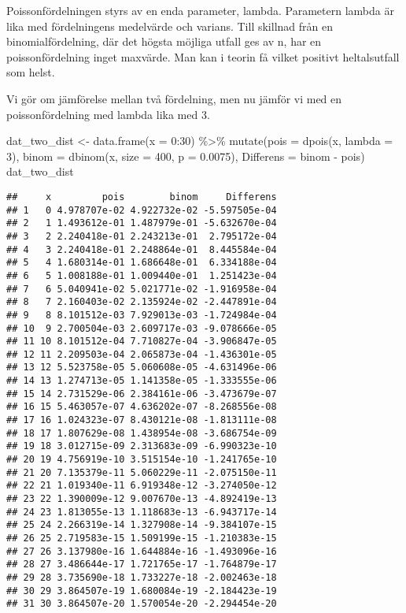 \documentclass[
]{book}
\newenvironment{Shaded}{\begin{snugshade}}{\end{snugshade}}
\newcommand{\AttributeTok}[1]{\textcolor[rgb]{0.77,0.63,0.00}{#1}}
\newcommand{\DecValTok}[1]{\textcolor[rgb]{0.00,0.00,0.81}{#1}}
\newcommand{\FloatTok}[1]{\textcolor[rgb]{0.00,0.00,0.81}{#1}}
\newcommand{\FunctionTok}[1]{\textcolor[rgb]{0.00,0.00,0.00}{#1}}
\newcommand{\NormalTok}[1]{#1}
\newcommand{\OtherTok}[1]{\textcolor[rgb]{0.56,0.35,0.01}{#1}}
\newcommand{\SpecialCharTok}[1]{\textcolor[rgb]{0.00,0.00,0.00}{#1}}
\theoremstyle{definition}
\theoremstyle{definition}
\theoremstyle{definition}
\theoremstyle{definition}
\theoremstyle{remark}
\begin{document}
Poissonfördelningen styrs av en enda parameter, lambda. Parametern lambda är lika med fördelningens medelvärde och varians. Till skillnad från en binomialfördelning, där det högsta möjliga utfall ges av n, har en poissonfördelning inget maxvärde. Man kan i teorin få vilket positivt heltalsutfall som helst.

Vi gör om jämförelse mellan två fördelning, men nu jämför vi med en poissonfördelning med lambda lika med 3.

\begin{Shaded}
\begin{Highlighting}[]
\NormalTok{dat\_two\_dist }\OtherTok{\textless{}{-}} \FunctionTok{data.frame}\NormalTok{(}\AttributeTok{x =} \DecValTok{0}\SpecialCharTok{:}\DecValTok{30}\NormalTok{) }\SpecialCharTok{\%\textgreater{}\%} 
  \FunctionTok{mutate}\NormalTok{(}\AttributeTok{pois =} \FunctionTok{dpois}\NormalTok{(x, }\AttributeTok{lambda =} \DecValTok{3}\NormalTok{),}
         \AttributeTok{binom =} \FunctionTok{dbinom}\NormalTok{(x, }\AttributeTok{size =} \DecValTok{400}\NormalTok{, }\AttributeTok{p =} \FloatTok{0.0075}\NormalTok{),}
         \AttributeTok{Differens =}\NormalTok{ binom }\SpecialCharTok{{-}}\NormalTok{ pois)}
\NormalTok{dat\_two\_dist}
\end{Highlighting}
\end{Shaded}

\begin{verbatim}
##     x         pois        binom     Differens
## 1   0 4.978707e-02 4.922732e-02 -5.597505e-04
## 2   1 1.493612e-01 1.487979e-01 -5.632670e-04
## 3   2 2.240418e-01 2.243213e-01  2.795172e-04
## 4   3 2.240418e-01 2.248864e-01  8.445584e-04
## 5   4 1.680314e-01 1.686648e-01  6.334188e-04
## 6   5 1.008188e-01 1.009440e-01  1.251423e-04
## 7   6 5.040941e-02 5.021771e-02 -1.916958e-04
## 8   7 2.160403e-02 2.135924e-02 -2.447891e-04
## 9   8 8.101512e-03 7.929013e-03 -1.724984e-04
## 10  9 2.700504e-03 2.609717e-03 -9.078666e-05
## 11 10 8.101512e-04 7.710827e-04 -3.906847e-05
## 12 11 2.209503e-04 2.065873e-04 -1.436301e-05
## 13 12 5.523758e-05 5.060608e-05 -4.631496e-06
## 14 13 1.274713e-05 1.141358e-05 -1.333555e-06
## 15 14 2.731529e-06 2.384161e-06 -3.473679e-07
## 16 15 5.463057e-07 4.636202e-07 -8.268556e-08
## 17 16 1.024323e-07 8.430121e-08 -1.813111e-08
## 18 17 1.807629e-08 1.438954e-08 -3.686754e-09
## 19 18 3.012715e-09 2.313683e-09 -6.990323e-10
## 20 19 4.756919e-10 3.515154e-10 -1.241765e-10
## 21 20 7.135379e-11 5.060229e-11 -2.075150e-11
## 22 21 1.019340e-11 6.919348e-12 -3.274050e-12
## 23 22 1.390009e-12 9.007670e-13 -4.892419e-13
## 24 23 1.813055e-13 1.118683e-13 -6.943717e-14
## 25 24 2.266319e-14 1.327908e-14 -9.384107e-15
## 26 25 2.719583e-15 1.509199e-15 -1.210383e-15
## 27 26 3.137980e-16 1.644884e-16 -1.493096e-16
## 28 27 3.486644e-17 1.721765e-17 -1.764879e-17
## 29 28 3.735690e-18 1.733227e-18 -2.002463e-18
## 30 29 3.864507e-19 1.680084e-19 -2.184423e-19
## 31 30 3.864507e-20 1.570054e-20 -2.294454e-20
\end{verbatim}
\end{document}
